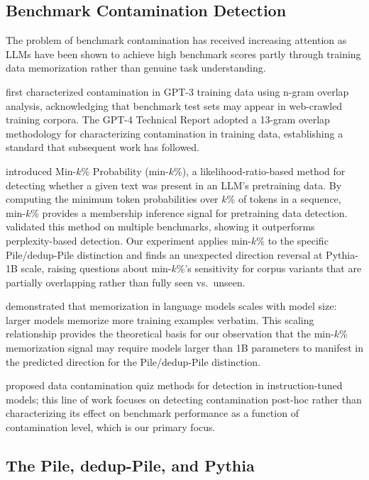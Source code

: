 \subsection{Benchmark Contamination Detection}

The problem of benchmark contamination has received increasing attention as LLMs have been
shown to achieve high benchmark scores partly through training data memorization rather
than genuine task understanding.

\citet{Brown2020Language} first characterized contamination in GPT-3 training data using n-gram
overlap analysis, acknowledging that benchmark test sets may appear in web-crawled
training corpora. The GPT-4 Technical Report adopted a 13-gram overlap methodology
for characterizing contamination in training data, establishing a standard that
subsequent work has followed.

\citet{Shi2023Detecting} introduced Min-$k$\% Probability (min-$k$\%), a likelihood-ratio-based
method for detecting whether a given text was present in an LLM's pretraining data.
By computing the minimum token probabilities over $k$\% of tokens in a sequence,
min-$k$\% provides a membership inference signal for pretraining data detection. \citet{Shi2023Detecting}
validated this method on multiple benchmarks, showing it outperforms perplexity-based
detection. Our experiment applies min-$k$\% to the specific Pile/dedup-Pile distinction
and finds an unexpected direction reversal at Pythia-1B scale, raising questions about
min-$k$\%'s sensitivity for corpus variants that are partially overlapping rather than
fully seen vs.\ unseen.

\citet{Carlini2021Extracting} demonstrated that memorization in language models scales with model
size: larger models memorize more training examples verbatim. This scaling relationship
provides the theoretical basis for our observation that the min-$k$\% memorization signal
may require models larger than 1B parameters to manifest in the predicted direction for the
Pile/dedup-Pile distinction.

\citet{Golchin2023Time} proposed data contamination quiz methods for detection in
instruction-tuned models; this line of work focuses on detecting contamination post-hoc
rather than characterizing its effect on benchmark performance as a function of contamination
level, which is our primary focus.

\subsection{The Pile, dedup-Pile, and Pythia}

